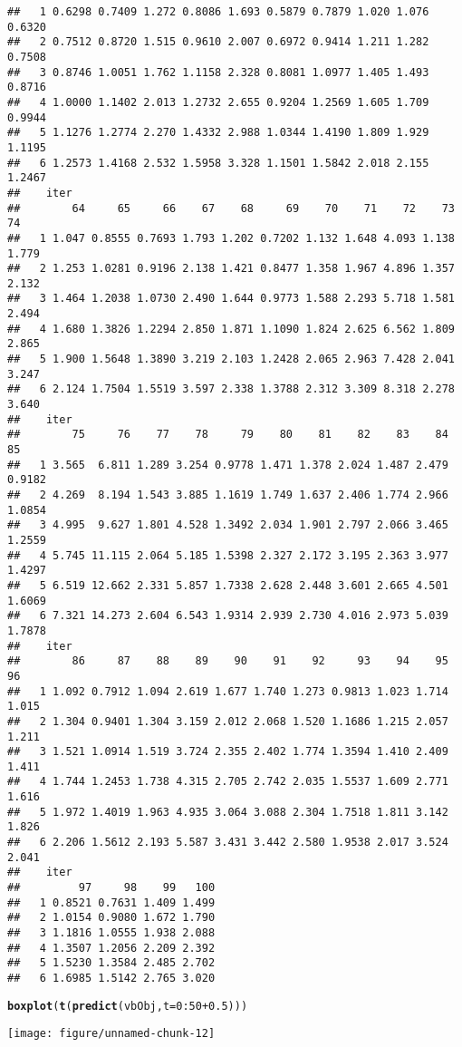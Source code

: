 \documentclass[a4paper,english,10pt]{article}\usepackage[]{graphicx}\usepackage[]{color}
\makeatletter
\def\maxwidth{ %
  \ifdim\Gin@nat@width>\linewidth
    \linewidth
  \else
    \Gin@nat@width
  \fi
}
\newcommand{\hlnum}[1]{\textcolor[rgb]{0.686,0.059,0.569}{#1}}%
\newcommand{\hlopt}[1]{\textcolor[rgb]{0,0,0}{#1}}%
\newcommand{\hlstd}[1]{\textcolor[rgb]{0.345,0.345,0.345}{#1}}%
\newcommand{\hlkwc}[1]{\textcolor[rgb]{0.333,0.667,0.333}{#1}}%
\newcommand{\hlkwd}[1]{\textcolor[rgb]{0.737,0.353,0.396}{\textbf{#1}}}%
\newenvironment{kframe}{%
 \def\at@end@of@kframe{}%
 \ifinner\ifhmode%
  \def\at@end@of@kframe{\end{minipage}}%
  \begin{minipage}{\columnwidth}%
 \fi\fi%
 \def\FrameCommand##1{\hskip\@totalleftmargin \hskip-\fboxsep
 \colorbox{shadecolor}{##1}\hskip-\fboxsep
     \hskip-\linewidth \hskip-\@totalleftmargin \hskip\columnwidth}%
 \MakeFramed {\advance\hsize-\width
   \@totalleftmargin\z@ \linewidth\hsize
   \@setminipage}}%
 {\par\unskip\endMakeFramed%
 \at@end@of@kframe}
\newenvironment{knitrout}{}{} %
\makeatother
\begin{document}
\begin{knitrout}
\begin{kframe}
\begin{verbatim}
##   1 0.6298 0.7409 1.272 0.8086 1.693 0.5879 0.7879 1.020 1.076 0.6320
##   2 0.7512 0.8720 1.515 0.9610 2.007 0.6972 0.9414 1.211 1.282 0.7508
##   3 0.8746 1.0051 1.762 1.1158 2.328 0.8081 1.0977 1.405 1.493 0.8716
##   4 1.0000 1.1402 2.013 1.2732 2.655 0.9204 1.2569 1.605 1.709 0.9944
##   5 1.1276 1.2774 2.270 1.4332 2.988 1.0344 1.4190 1.809 1.929 1.1195
##   6 1.2573 1.4168 2.532 1.5958 3.328 1.1501 1.5842 2.018 2.155 1.2467
##    iter
##        64     65     66    67    68     69    70    71    72    73    74
##   1 1.047 0.8555 0.7693 1.793 1.202 0.7202 1.132 1.648 4.093 1.138 1.779
##   2 1.253 1.0281 0.9196 2.138 1.421 0.8477 1.358 1.967 4.896 1.357 2.132
##   3 1.464 1.2038 1.0730 2.490 1.644 0.9773 1.588 2.293 5.718 1.581 2.494
##   4 1.680 1.3826 1.2294 2.850 1.871 1.1090 1.824 2.625 6.562 1.809 2.865
##   5 1.900 1.5648 1.3890 3.219 2.103 1.2428 2.065 2.963 7.428 2.041 3.247
##   6 2.124 1.7504 1.5519 3.597 2.338 1.3788 2.312 3.309 8.318 2.278 3.640
##    iter
##        75     76    77    78     79    80    81    82    83    84     85
##   1 3.565  6.811 1.289 3.254 0.9778 1.471 1.378 2.024 1.487 2.479 0.9182
##   2 4.269  8.194 1.543 3.885 1.1619 1.749 1.637 2.406 1.774 2.966 1.0854
##   3 4.995  9.627 1.801 4.528 1.3492 2.034 1.901 2.797 2.066 3.465 1.2559
##   4 5.745 11.115 2.064 5.185 1.5398 2.327 2.172 3.195 2.363 3.977 1.4297
##   5 6.519 12.662 2.331 5.857 1.7338 2.628 2.448 3.601 2.665 4.501 1.6069
##   6 7.321 14.273 2.604 6.543 1.9314 2.939 2.730 4.016 2.973 5.039 1.7878
##    iter
##        86     87    88    89    90    91    92     93    94    95    96
##   1 1.092 0.7912 1.094 2.619 1.677 1.740 1.273 0.9813 1.023 1.714 1.015
##   2 1.304 0.9401 1.304 3.159 2.012 2.068 1.520 1.1686 1.215 2.057 1.211
##   3 1.521 1.0914 1.519 3.724 2.355 2.402 1.774 1.3594 1.410 2.409 1.411
##   4 1.744 1.2453 1.738 4.315 2.705 2.742 2.035 1.5537 1.609 2.771 1.616
##   5 1.972 1.4019 1.963 4.935 3.064 3.088 2.304 1.7518 1.811 3.142 1.826
##   6 2.206 1.5612 2.193 5.587 3.431 3.442 2.580 1.9538 2.017 3.524 2.041
##    iter
##         97     98    99   100
##   1 0.8521 0.7631 1.409 1.499
##   2 1.0154 0.9080 1.672 1.790
##   3 1.1816 1.0555 1.938 2.088
##   4 1.3507 1.2056 2.209 2.392
##   5 1.5230 1.3584 2.485 2.702
##   6 1.6985 1.5142 2.765 3.020
\end{verbatim}
\end{kframe}
\end{knitrout}


\begin{knitrout}
\color{fgcolor}\begin{kframe}
\begin{alltt}
\hlkwd{boxplot}\hlstd{(}\hlkwd{t}\hlstd{(}\hlkwd{predict}\hlstd{(vbObj,} \hlkwc{t} \hlstd{=} \hlnum{0}\hlopt{:}\hlnum{50} \hlopt{+} \hlnum{0.5}\hlstd{)))}
\end{alltt}
\end{kframe}
\texttt{[image: figure/unnamed-chunk-12]} 

\end{knitrout}
\end{document}
